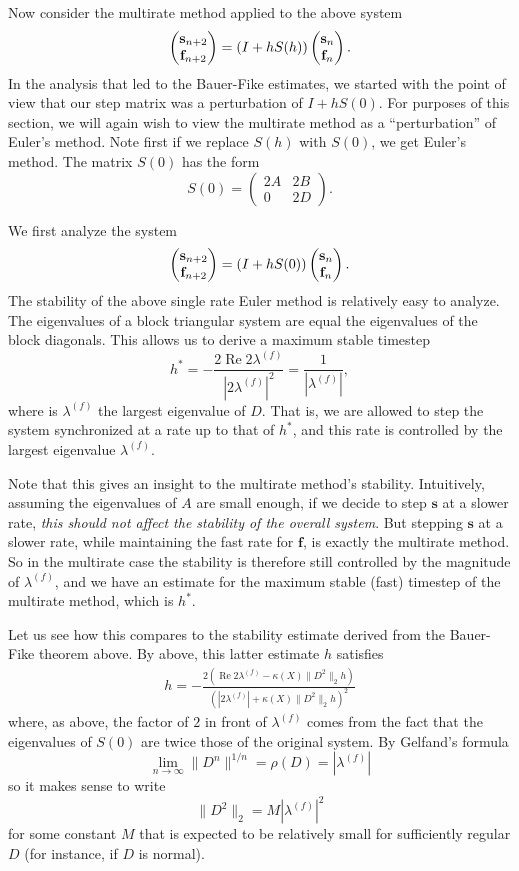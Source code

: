 \documentclass[10pt]{article}
\renewcommand{\Re}{\mathop{\textrm{Re}}}
\begin{document}
Now consider the multirate method applied to the above system
%
\[ \slowfast[n+2] = (I + hS(h)) \slowfast[n]. \]
%
In the analysis that led to the Bauer-Fike estimates, we started with
the point of view that our step matrix was a perturbation of $I +
hS(0)$. For purposes of this section, we will again wish to view the
multirate method as a ``perturbation'' of Euler's method. Note first if
we replace $S(h)$ with $S(0)$, we get Euler's method. The matrix $S(0)$
has the form
%
\[ S(0) = \begin{pmatrix} 2A & 2B \\ 0 & 2D \end{pmatrix}. \]
%

We first analyze the system
%
\[ \slowfast[n+2] = (I + hS(0)) \slowfast[n]. \]
%
The stability of the above single rate Euler method is relatively easy
to analyze.  The eigenvalues of a block triangular system are equal the
eigenvalues of the block diagonals. This allows us to derive a maximum
stable timestep
%
\[ h^* = -\frac{2 \Re 2\lambda^{(f)}}{|2 \lambda^{(f)}|^2} 
 = \frac{1}{| \lambda^{(f)} |}, \]
%
where is $\lambda^{(f)}$ the largest eigenvalue of $D$.  That is, we are
allowed to step the system synchronized at a rate up to that of $h^*$,
and this rate is controlled by the largest eigenvalue $\lambda^{(f)}$.

Note that this gives an insight to the multirate method's stability.
Intuitively, assuming the eigenvalues of $A$ are small enough, if we
decide to step $\mathbf{s}$ at a slower rate, \emph{this should not
  affect the stability of the overall system}. But stepping $\mathbf{s}$
at a slower rate, while maintaining the fast rate for $\mathbf{f}$, is
exactly the multirate method. So in the multirate case the stability is
therefore still controlled by the magnitude of $\lambda^{(f)}$, and we
have an estimate for the maximum stable (fast) timestep of the multirate
method, which is $h^*$.

Let us see how this compares to the stability estimate derived from the
Bauer-Fike theorem above. By above, this latter estimate $h$ satisfies
%
\begin{align*}
h = -\frac{2 (\Re 2\lambda^{(f)} - \kappa(X) \|D^2\|_2 h)}
{(|2\lambda^{(f)}| + \kappa(X) \|D^2\|_2 h)^2}
\end{align*}
%
where, as above, the factor of $2$ in front of $\lambda^{(f)}$ comes
from the fact that the eigenvalues of $S(0)$ are twice those of the
original system. By Gelfand's formula
%
\[ \lim_{n \to \infty} \|D^n\|^{1/n} = \rho(D) = |\lambda^{(f)}| \]
%
so it makes sense to write
%
\[
\|D^2\|_2 = M |\lambda^{(f)}|^2
\]
%
for some constant $M$ that is expected to be relatively small for
sufficiently regular $D$ (for instance, if $D$ is normal).
%
\end{document}
